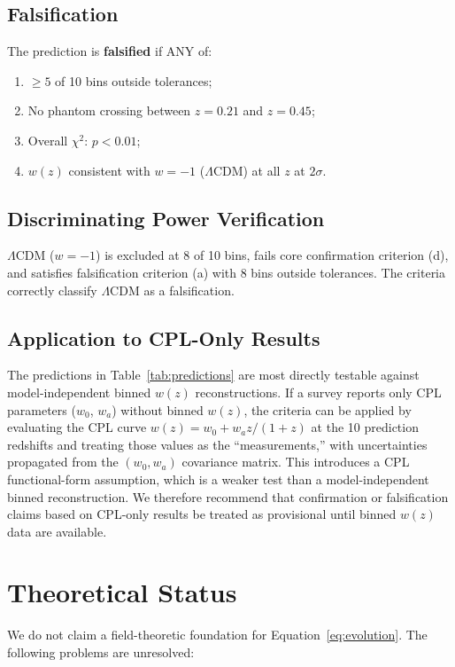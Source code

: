 \documentclass[12pt,preprint]{aastex631}
\begin{document}
\subsection{Falsification}

The prediction is \textbf{falsified} if ANY of:
\begin{enumerate}
\item[(a)] $\geq 5$ of 10 bins outside tolerances;
\item[(b)] No phantom crossing between $z = 0.21$ and $z = 0.45$;
\item[(c)] Overall $\chi^2$: $p < 0.01$;
\item[(d)] $w(z)$ consistent with $w = -1$ ($\Lambda$CDM) at all $z$ at $2\sigma$.
\end{enumerate}

\subsection{Discriminating Power Verification}

$\Lambda$CDM ($w = -1$) is excluded at 8 of 10 bins, fails core confirmation criterion (d), and satisfies falsification criterion (a) with 8 bins outside tolerances. The criteria correctly classify $\Lambda$CDM as a falsification.

\subsection{Application to CPL-Only Results}

The predictions in Table~\ref{tab:predictions} are most directly testable against model-independent binned $w(z)$ reconstructions. If a survey reports only CPL parameters ($w_0$, $w_a$) without binned $w(z)$, the criteria can be applied by evaluating the CPL curve $w(z) = w_0 + w_a z/(1+z)$ at the 10 prediction redshifts and treating those values as the ``measurements,'' with uncertainties propagated from the $(w_0, w_a)$ covariance matrix. This introduces a CPL functional-form assumption, which is a weaker test than a model-independent binned reconstruction. We therefore recommend that confirmation or falsification claims based on CPL-only results be treated as provisional until binned $w(z)$ data are available.

\section{Theoretical Status}

We do not claim a field-theoretic foundation for Equation~\ref{eq:evolution}. The following problems are unresolved:
\end{document}
